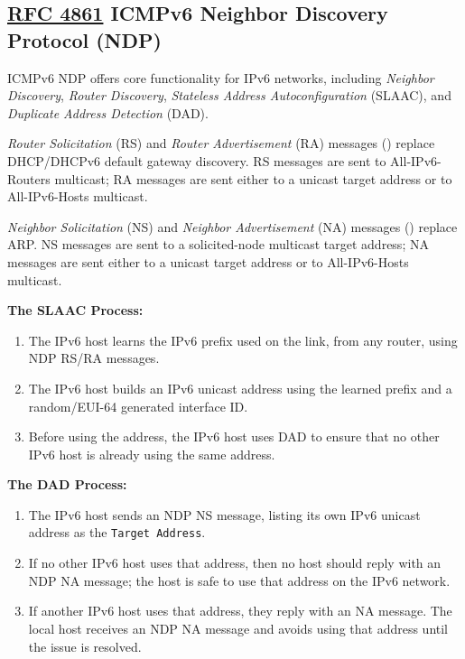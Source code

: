 \documentclass[12pt]{article}
\newcommand{\RFC}[1]{\href{https://datatracker.ietf.org/doc/html/rfc#1}{RFC #1}}
\begin{document}
	\subsection[RFC 4861 ICMPv6 NDP]{\RFC{4861} ICMPv6 Neighbor Discovery Protocol (NDP) \label{subsec:NDP}}
	ICMPv6 NDP offers core functionality for IPv6 networks, including \textit{Neighbor Discovery}, \textit{Router Discovery}, \textit{Stateless Address Autoconfiguration} (SLAAC), and \textit{Duplicate Address Detection} (DAD).

	\textit{Router Solicitation} (RS) and \textit{Router Advertisement} (RA) messages () replace DHCP/DHCPv6 default gateway discovery. RS messages are sent to All-IPv6-Routers multicast; RA messages are sent either to a unicast target address or to All-IPv6-Hosts multicast.

	\textit{Neighbor Solicitation} (NS) and \textit{Neighbor Advertisement} (NA) messages () replace ARP. NS messages are sent to a solicited-node multicast target address; NA messages are sent either to a unicast target address or to All-IPv6-Hosts multicast.

	\textbf{The SLAAC Process:}
	\begin{enumerate} \itemsep -5pt
		\label{itm:NDP SLAAC}
		\item{The IPv6 host learns the IPv6 prefix used on the link, from any router, using NDP RS/RA messages.}
		\item{The IPv6 host builds an IPv6 unicast address using the learned prefix and a random/EUI-64 generated interface ID.}
		\item{Before using the address, the IPv6 host uses DAD to ensure that no other IPv6 host is already using the same address.}
	\end{enumerate}

	\textbf{The DAD Process:}
	\begin{enumerate} \itemsep -5pt
		\label{itm:NDP DAD}
		\item{The IPv6 host sends an NDP NS message, listing its own IPv6 unicast address as the \texttt{Target Address}.}
		\item{If no other IPv6 host uses that address, then no host should reply with an NDP NA message; the host is safe to use that address on the IPv6 network.}
		\item{If another IPv6 host uses that address, they reply with an NA message. The local host receives an NDP NA message and avoids using that address until the issue is resolved.}
	\end{enumerate}
\end{document}
